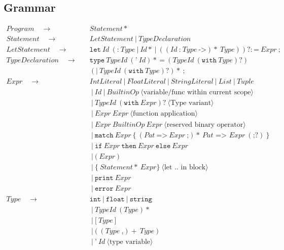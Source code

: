 \documentclass[a4paper, 12pt]{article}
\theoremstyle{myplain}
\theoremstyle{mydefinition}
\theoremstyle{myremark}
\numberwithin{equation} {section}
\numberwithin{figure}   {section}
\numberwithin{table}    {section}
\newcommand{\sepbar}{\: | \:}	%
\newcommand{\substo}{\quad\rightarrow\quad}
\begin{document}
\subsection{Grammar}
\begin{align*}
Program \substo& Statement*\\
Statement \substo& LetStatement \sepbar TypeDeclaration\\
LetStatement \substo& \texttt{let}\: Id \: (\texttt{:}\: Type\sepbar Id* \sepbar ((Id\: \texttt{:}\:Type\:\texttt{->})*\:Type))?:\texttt{=}\: Expr\:\texttt{;}\\
TypeDeclaration \substo& \texttt{type}\: TypeId\: (\texttt{'}\: Id)*\: \texttt{=} \: (TypeId \: (\texttt{with}\: Type)?)\\
&(\texttt{|}\:TypeId \: (\texttt{with}\: Type)?)*\:\texttt{;}\\
Expr\substo& IntLiteral \sepbar FloatLiteral \sepbar StringLiteral \sepbar List \sepbar Tuple\\
& \sepbar Id \sepbar BuiltinOp\:\langle\text{variable/func within current scope}\rangle\\
& \sepbar TypeId\: (\texttt{with}\: Expr)?\: \langle\text{Type variant}\rangle\\
& \sepbar Expr\:Expr\:\langle\text{function application}\rangle\\
& \sepbar Expr \: BuiltinOp \: Expr\:\langle\text{reserved binary operator}\rangle \\
& \sepbar \texttt{match}\: Expr \: \texttt{\{} \: (Pat \: \texttt{=>}\: Expr\: \texttt{;})*\: Pat\texttt{ => } Expr \: (\texttt{;}?) \: \texttt{\}} \\
& \sepbar \texttt{if}\: Expr \: \texttt{then} \: Expr \: \texttt{else} \: Expr \\
& \sepbar \texttt{(}\: Expr \:\texttt{)}\\
& \sepbar \texttt{\{}\: Statement*\: Expr\texttt{\}} \:\langle \text{let .. in block}\rangle\\
& \sepbar \texttt{print} \: Expr \\
& \sepbar \texttt{error} \: Expr \\
Type \substo& \texttt{int} \sepbar \texttt{float} \sepbar \texttt{string}\\
& \sepbar TypeId\: (Type)*\\
& \sepbar \texttt{[}\:Type\:\texttt{]}\\
& \sepbar \texttt{(} \: (Type\: \texttt{,} )+\: Type\: \texttt{)}\\
& \sepbar \texttt{'}\:Id \: \langle\text{type variable}\rangle\\

\end{align*}
\end{document}
